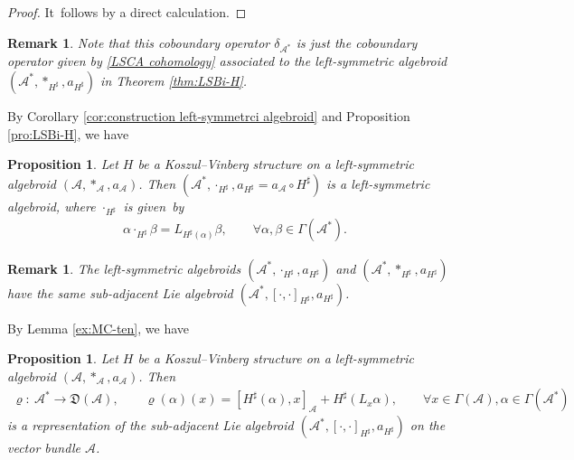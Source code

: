 \documentclass[10pt,a4paper]{amsart}
\numberwithin{equation}{section}
\newtheorem{pro}[thm]{Proposition}
\newtheorem{rmk}[thm]{Remark}
\newcommand{\huaA}{\mathcal{A}}
\newcommand{\frkD}{\mathfrak D}
\begin{document}
\begin{proof}
 It~follows by a direct calculation.
\end{proof}
\begin{rmk}
 Note that this coboundary operator $\delta_{\huaA^*}$ is just the coboundary operator given by \eqref{LSCA cohomology} associated to the left-symmetric algebroid $(\huaA^*,\ast_{H^\sharp},a_{H^\sharp})$ in Theorem \ref{thm:LSBi-H}.
\end{rmk}



By Corollary \ref{cor:construction left-symmetrci algebroid} and Proposition \ref{pro:LSBi-H}, we have
\begin{pro}
 {\sloppy Let $H$ be a Koszul--Vinberg structure on a left-symmetric algebroid $(\huaA,\ast_\huaA,a_\huaA)$. Then $(\huaA^*,\cdot_{H^\sharp},a_{H^\sharp}=a_\huaA\circ H^\sharp)$ is a left-symmetric algebroid, where $\cdot_{H^\sharp}$ is given~by
 \begin{gather*}
 \alpha\cdot_{H^\sharp}\beta=L_{H^\sharp(\alpha)}\beta,\qquad
 \forall \alpha,\beta\in\Gamma(\huaA^*).
 \end{gather*}}
\end{pro}

\begin{rmk}
 The left-symmetric algebroids $(\huaA^*,\cdot_{H^\sharp},a_{H^\sharp})$ and $(\huaA^*,\ast_{H^\sharp},a_{H^\sharp})$ have the same sub-adjacent Lie algebroid $(\huaA^*,[\cdot,\cdot]_{H^\sharp},a_{H^\sharp})$.
\end{rmk}



By Lemma \ref{ex:MC-ten}, we have
\begin{pro}%
{\sloppy Let $H$ be a Koszul--Vinberg structure on a left-symmetric algebroid $(\huaA,\ast_\huaA,a_\huaA)$.
 Then
 \begin{gather}\label{eq:rep-coadjoint}
\varrho\colon\ \huaA^*\longrightarrow \frkD(\huaA),\qquad \varrho(\alpha)(x)=[H^\sharp(\alpha),x]_{\huaA}+H^\sharp(L_x\alpha ),\qquad \forall x\in\Gamma{(\huaA)},\alpha\in\Gamma(\huaA^*)
\end{gather}}\noindent
 is a representation of the sub-adjacent Lie algebroid $(\huaA^*,[\cdot,\cdot]_{H^\sharp},a_{H^\sharp})$ on the vector bundle $\huaA$.
\end{pro}
\end{document}
